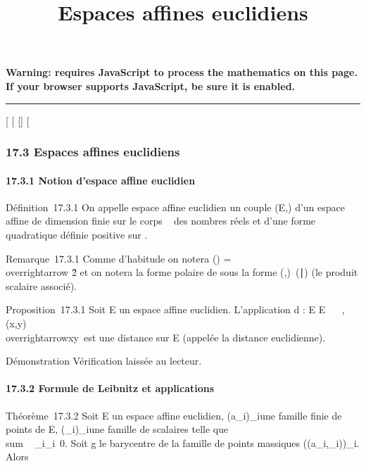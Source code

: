 \documentclass[]{article}
\title{Espaces affines euclidiens}
\author{}
\date{}
\begin{document}
\maketitle

\textbf{Warning: 
requires JavaScript to process the mathematics on this page.\\ If your
browser supports JavaScript, be sure it is enabled.}

\begin{center}\rule{3in}{0.4pt}\end{center}

{[}
{[}
{[}{]}
{[}

\subsubsection{17.3 Espaces affines euclidiens}

\paragraph{17.3.1 Notion d'espace affine euclidien}

Définition~17.3.1 On appelle espace affine euclidien un couple (E,\Phi)
d'un espace affine de dimension finie sur le corps ~ des nombres réels
et d'une forme quadratique définie positive \Phi sur
\overrightarrowE.

Remarque~17.3.1 Comme d'habitude on notera
\Phi(\overrightarrow\xi)
=\\overrightarrow
\xi\^2 et on notera la forme polaire
de \Phi sous la forme
(\overrightarrow\xi,\overrightarrow\eta)\mapsto~(\overrightarrow\xi\mathrel∣\overrightarrow\eta)
(le produit scalaire associé).

Proposition~17.3.1 Soit E un espace affine euclidien. L'application d :
E \times E \rightarrow~ ~,
(x,y)\mapsto~\\overrightarrowxy\
est une distance sur E (appelée la distance euclidienne).

Démonstration Vérification laissée au lecteur.

\paragraph{17.3.2 Formule de Leibnitz et applications}

Théorème~17.3.2 Soit E un espace affine euclidien,
(a_i)_i\inI une famille finie de points de E,
(\lambda_i)_i\inI une famille de scalaires telle que
\\sum ~
_i\inI\lambda_i\neq~0. Soit g le
barycentre de la famille de points massiques \left
((a_i,\lambda_i)\right )_i\inI. Alors
\end{document}
